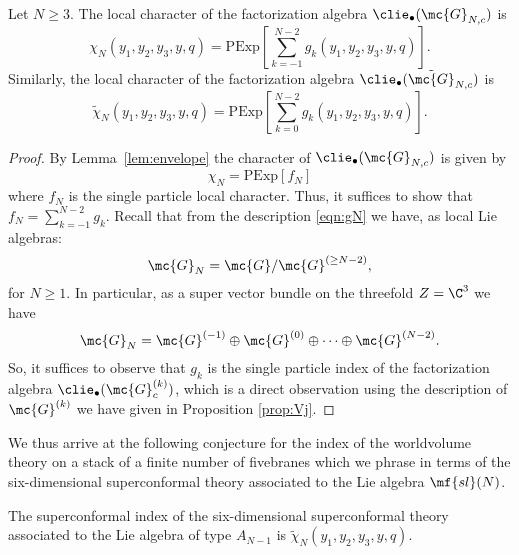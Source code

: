 \begin{thm}
\label{thm:finite}
Let $N \geq 3$. 
The local character of the factorization algebra $\clie_{\bullet}(\mc{G}_{N,c})$ is
\begin{equation}
\chi_{N}(y_1,y_2,y_3,y,q) = \text{PExp}\left[\sum_{k=-1}^{N-2} g_k(y_1,y_2,y_3,y,q)\right].
\end{equation}
Similarly, the local character of the factorization algebra $\clie_\bullet(\tilde{\mc{G}}_{N,c})$ is 
\begin{equation}
\tilde{\chi}_{N}(y_1,y_2,y_3,y,q) = \text{PExp}\left[\sum_{k=0}^{N-2} g_k(y_1,y_2,y_3,y,q)\right].
\end{equation}
\end{thm}
\begin{proof}
By Lemma~\ref{lem:envelope} the character of $\clie_\bullet (\mc{G}_{N,c})$ is given by 
\begin{equation}
\chi_N = \text{PExp} \left[f_N\right]
\end{equation}
where $f_N$ is the single particle local character.
Thus, it suffices to show that $f_N = \sum_{k = -1}^{N-2} g_k$.
Recall that from the description \eqref{eqn:gN} we have, as local Lie algebras:
\begin{equation}
\mc{G}_N = \mc{G} / \mc{G}^{(\geq N-2)} ,
\end{equation} 
for $N \geq 1$. 
In particular, as a super vector bundle on the threefold $Z = \C^3$ we have
\[
\mc{G}_N = \mc{G}^{(-1)} \oplus \mc{G}^{(0)} \oplus \cdots \oplus \mc{G}^{(N-2)} .
\]
So, it suffices to observe that $g_k$ is the single particle index of the factorization algebra $\clie_\bullet(\mc{G}^{(k)}_c)$, which is a direct observation using the description of $\mc{G}^{(k)}$ we have given in Proposition \ref{prop:Vj}.
\end{proof}

We thus arrive at the following conjecture for the index of the worldvolume theory on a stack of a finite number of fivebranes which we phrase in terms of the six-dimensional superconformal theory associated to the Lie algebra $\mf{sl}(N)$.

\begin{conj} 
The superconformal index of the six-dimensional superconformal theory associated to the Lie algebra of type $A_{N-1}$ is $\tilde \chi_{N}(y_1,y_2,y_3,y,q)$. 
\end{conj}

